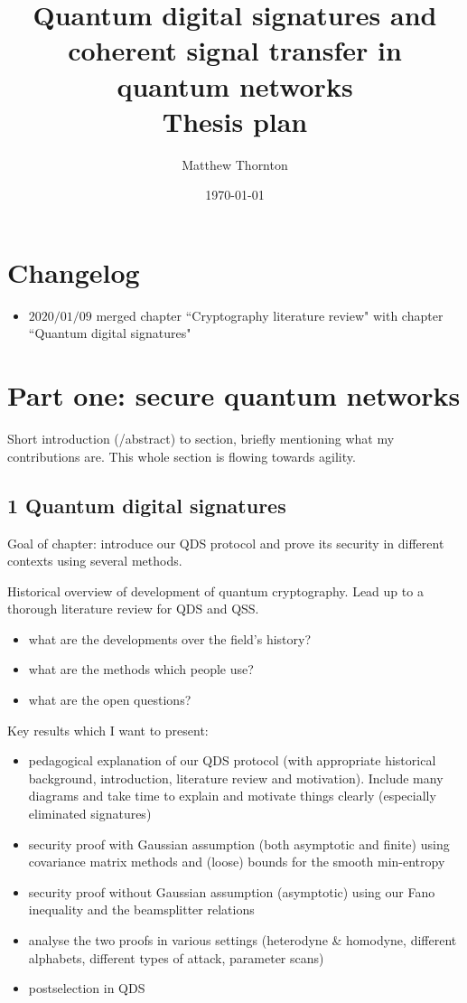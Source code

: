 \documentclass{article}
\title{Quantum digital signatures and coherent signal transfer in quantum networks \\ \vspace{0.2in}  \Large Thesis plan}
\author{Matthew Thornton}
\date{\today}
\begin{document}
\maketitle 


\section*{Changelog}
\begin{itemize}
\item $2020/01/09$ merged chapter ``Cryptography literature review" with chapter ``Quantum digital signatures"
\end{itemize}

\section*{Part one: secure quantum networks}
Short introduction (/abstract) to section, briefly mentioning what my contributions are. This whole section is flowing towards agility.

\subsection*{1 Quantum digital signatures}
Goal of chapter: introduce our QDS protocol and prove its security in different contexts using several methods.

Historical overview of development of quantum cryptography. Lead up to a thorough literature review for QDS and QSS.
\begin{itemize}
\item what are the developments over the field's history?
\item what are the methods which people use?
\item what are the open questions?
\end{itemize}


Key results which I want to present:
\begin{itemize}
\item pedagogical explanation of our QDS protocol (with appropriate historical background, introduction, literature review and motivation). Include many diagrams and take time to explain and motivate things clearly (especially eliminated signatures)
\item security proof with Gaussian assumption (both asymptotic and finite) using covariance matrix methods and (loose) bounds for the smooth min-entropy
\item security proof without Gaussian assumption (asymptotic) using our Fano inequality and the beamsplitter relations
\item analyse the two proofs in various settings (heterodyne \& homodyne, different alphabets, different types of attack, parameter scans)
\item postselection in QDS
\end{itemize}
\end{document}
